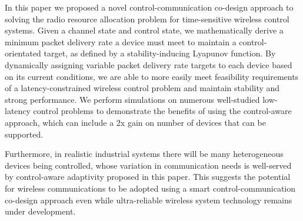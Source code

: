 In this paper we proposed a novel control-communication co-design approach to solving the radio resource
allocation problem for time-sensitive wireless control systems. Given a channel state and control state, we mathematically derive a minimum packet delivery
rate a device must meet to maintain a control-orientated target,
as defined by a stability-inducing Lyapunov function. By
dynamically assigning variable packet delivery rate targets
to each device based on its current conditions, we are able to
more easily meet feasibility requirements of a latency-constrained
wireless control problem and maintain stability
and strong performance. We perform simulations on numerous
well-studied low-latency control problems to demonstrate the
benefits of using the control-aware approach, which can include
a 2x gain on number of devices that can be supported.

 Furthermore, in realistic industrial systems there will be many heterogeneous devices being controlled, whose variation in communication needs is well-served by control-aware adaptivity proposed in this paper. This suggests the potential for wireless communications to be adopted using a smart control-communication co-design approach even
while ultra-reliable wireless system technology remains under development.